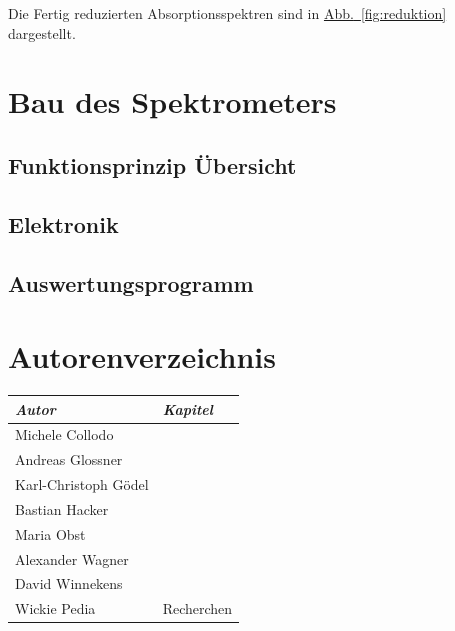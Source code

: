 \documentclass[11pt]{scrartcl}
\newcommand{\hypref}[2]{\hyperref[#2]{{#1}~\ref{#2}}}
\begin{document}
Die Fertig reduzierten Absorptions\-spektren sind in \hypref{Abb.}{fig:reduktion} dargestellt.



\section{Bau des Spektrometers}
\subsection{Funktionsprinzip Übersicht}

\subsection{Elektronik}

\subsection{Auswertungsprogramm}



\newpage
\section{Autorenverzeichnis}
\begin{tabular}{|l|l|}
\hline
\emph{Autor} & \emph{Kapitel}\\
\hline
Michele Collodo & \\
Andreas Glossner & \\
Karl-Christoph G\"odel & \\
Bastian Hacker & \\
Maria Obst & \\
Alexander Wagner & \\
David Winnekens &  \\
Wickie Pedia & Recherchen \\
\hline
\end{tabular}
\end{document}
